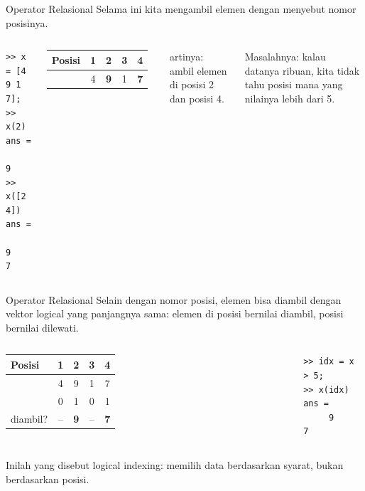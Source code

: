 \documentclass[t,aspectratio=169,11pt]{beamer}
\newcommand{\cc}[1]{\texttt{\detokenize{#1}}}
\begin{document}
\begin{frame}[fragile]{Operator Relasional}
Selama ini kita mengambil elemen dengan menyebut \alert{nomor posisinya}.

\begin{columns}[T]
\begin{lstlisting}
>> x = [4 9 1 7];
>> x(2)
ans =
     9
>> x([2 4])
ans =
     9     7
\end{lstlisting}
\centering\small
\begin{tabular}{lcccc}
\toprule
Posisi & 1 & 2 & 3 & 4 \\
\midrule
\cc{x} & 4 & \textbf{9} & 1 & \textbf{7} \\
\bottomrule
\end{tabular}

\vspace{8pt}
\raggedright
\cc{x([2 4])} artinya: ambil elemen di posisi 2 dan posisi 4.

\vspace{6pt}
Masalahnya: kalau datanya ribuan, kita tidak tahu posisi mana yang nilainya lebih dari 5.
\end{columns}
\end{frame}

\begin{frame}[fragile]{Operator Relasional}
Selain dengan nomor posisi, elemen bisa diambil dengan \alert{vektor logical} yang panjangnya sama:
elemen di posisi bernilai \cc{1} diambil, posisi bernilai \cc{0} dilewati.

\begin{columns}[T]
\centering\small
\begin{tabular}{lcccc}
\toprule
Posisi & 1 & 2 & 3 & 4 \\
\midrule
\cc{x}    & 4 & 9 & 1 & 7 \\
\cc{idx}  & 0 & 1 & 0 & 1 \\
diambil?  & -- & \textbf{9} & -- & \textbf{7} \\
\bottomrule
\end{tabular}
\begin{lstlisting}
>> idx = x > 5;
>> x(idx)
ans =
     9     7
\end{lstlisting}
\end{columns}

\vspace{6pt}
\small Inilah yang disebut \alert{logical indexing}: memilih data berdasarkan syarat, bukan berdasarkan posisi.
\end{frame}
\end{document}
